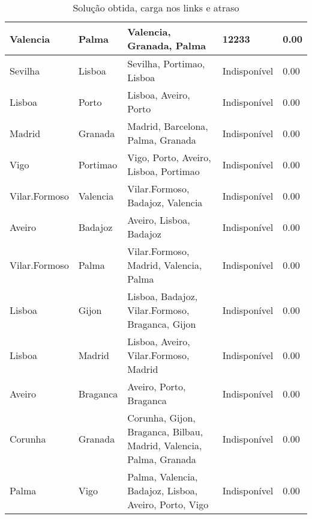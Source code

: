 \begin{table}[!htb]
{\begin{tabular}{|l|l|l|l|l|}
Valencia & Palma & Valencia, Granada, Palma & 12233 & 0.00 \\ \hline
Sevilha & Lisboa & Sevilha, Portimao, Lisboa & Indisponível & 0.00 \\ \hline
Lisboa & Porto & Lisboa, Aveiro, Porto & Indisponível & 0.00 \\ \hline
Madrid & Granada & Madrid, Barcelona, Palma, Granada & Indisponível & 0.00 \\ \hline
Vigo & Portimao & Vigo, Porto, Aveiro, Lisboa, Portimao & Indisponível & 0.00 \\ \hline
Vilar.Formoso & Valencia & Vilar.Formoso, Badajoz, Valencia & Indisponível & 0.00 \\ \hline
Aveiro & Badajoz & Aveiro, Lisboa, Badajoz & Indisponível & 0.00 \\ \hline
Vilar.Formoso & Palma & Vilar.Formoso, Madrid, Valencia, Palma & Indisponível & 0.00 \\ \hline
Lisboa & Gijon & Lisboa, Badajoz, Vilar.Formoso, Braganca, Gijon & Indisponível & 0.00 \\ \hline
Lisboa & Madrid & Lisboa, Aveiro, Vilar.Formoso, Madrid & Indisponível & 0.00 \\ \hline
Aveiro & Braganca & Aveiro, Porto, Braganca & Indisponível & 0.00 \\ \hline
Corunha & Granada & Corunha, Gijon, Braganca, Bilbau, Madrid, Valencia, Palma, Granada & Indisponível & 0.00 \\ \hline
Palma & Vigo & Palma, Valencia, Badajoz, Lisboa, Aveiro, Porto, Vigo & Indisponível & 0.00 \\ \hline
\end{tabular}}
\caption[]{Solução obtida, carga nos links e atraso}
\end{table}

